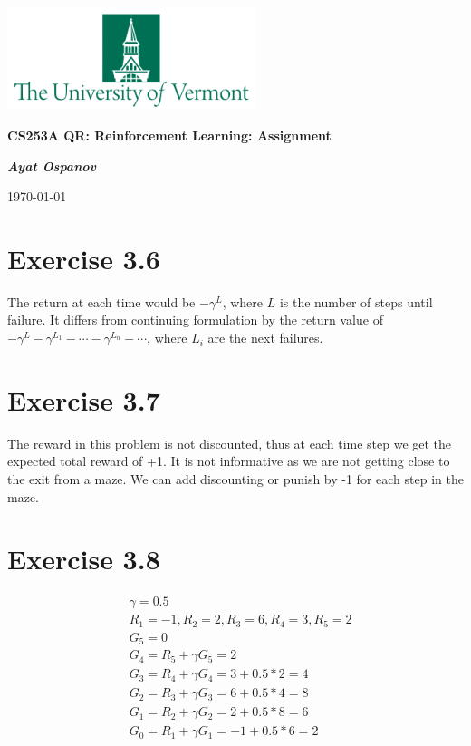 \documentclass[12pt, a4paper]{article}
\begin{document}
    \begin{center}
        \includegraphics[height=3cm]{UVM.png}

        {\large\textbf{
            CS253A QR: Reinforcement Learning: Assignment 
        }}

        \vspace{0.3cm}

        \textit{\textbf{Ayat Ospanov}}

        \today
    \end{center}

    \tableofcontents
    \section{Exercise 3.6}
        The return at each time would be $-\gamma^L$, where $L$ is the number of
        steps until failure. It differs from continuing formulation by the return
        value of $-\gamma^{L} -\gamma^{L_1} - \cdots - \gamma^{L_n} - \cdots$,
        where $L_i$ are the next failures.

    \section{Exercise 3.7}
        The reward in this problem is not discounted, thus at each time step we
        get the expected total reward of +1. It is not informative as we are not
        getting close to the exit from a maze. We can add discounting or punish
        by -1 for each step in the maze.

    \section{Exercise 3.8}
        \begin{align*}
            &\gamma = 0.5\\
            &R_1 = -1, R_2 = 2, R_3 = 6, R_4 = 3, R_5 = 2\\
            &G_5 = 0\\
            &G_4 = R_5 + \gamma G_5 = 2\\
            &G_3 = R_4 + \gamma G_4 = 3 + 0.5 * 2 = 4\\
            &G_2 = R_3 + \gamma G_3 = 6 + 0.5 * 4 = 8\\
            &G_1 = R_2 + \gamma G_2 = 2 + 0.5 * 8 = 6\\
            &G_0 = R_1 + \gamma G_1 = -1 + 0.5 * 6 = 2\\
        \end{align*}
\end{document}
